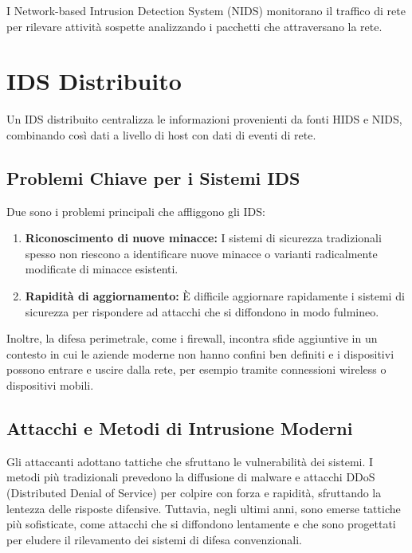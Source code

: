 I Network-based Intrusion Detection System (NIDS) monitorano il traffico di rete per rilevare attività sospette analizzando i pacchetti che attraversano la rete.

\section{IDS Distribuito}

Un IDS distribuito centralizza le informazioni provenienti da fonti HIDS e NIDS, combinando così dati a livello di host con dati di eventi di rete.

\subsection{Problemi Chiave per i Sistemi IDS}

Due sono i problemi principali che affliggono gli IDS:

\begin{enumerate}
    \item \textbf{Riconoscimento di nuove minacce:} I sistemi di sicurezza tradizionali spesso non riescono a identificare nuove minacce o varianti radicalmente modificate di minacce esistenti.
    
    \item \textbf{Rapidità di aggiornamento:} È difficile aggiornare rapidamente i sistemi di sicurezza per rispondere ad attacchi che si diffondono in modo fulmineo.
\end{enumerate}

Inoltre, la difesa perimetrale, come i firewall, incontra sfide aggiuntive in un contesto in cui le aziende moderne non hanno confini ben definiti e i dispositivi possono entrare e uscire dalla rete, per esempio tramite connessioni wireless o dispositivi mobili.

\subsection{Attacchi e Metodi di Intrusione Moderni}

Gli attaccanti adottano tattiche che sfruttano le vulnerabilità dei sistemi. I metodi più tradizionali prevedono la diffusione di malware e attacchi DDoS (Distributed Denial of Service) per colpire con forza e rapidità, sfruttando la lentezza delle risposte difensive. Tuttavia, negli ultimi anni, sono emerse tattiche più sofisticate, come attacchi che si diffondono lentamente e che sono progettati per eludere il rilevamento dei sistemi di difesa convenzionali.

